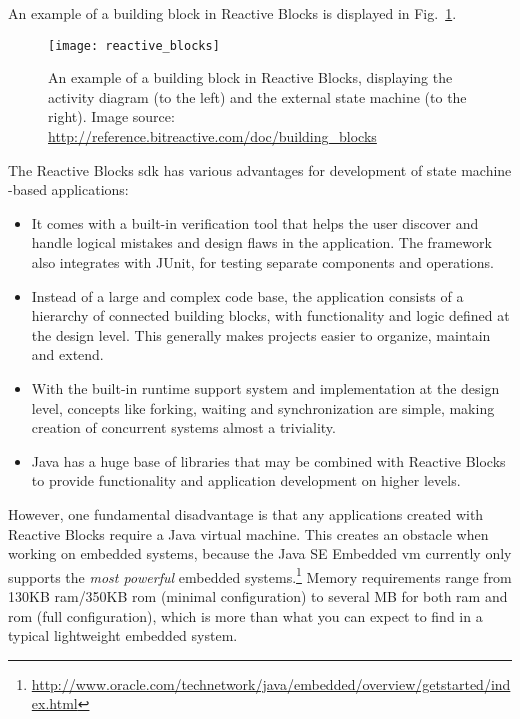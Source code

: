\noindent
An example of a building block in Reactive Blocks is displayed in Fig.~\ref{figure:reactive_blocks}.

\begin{figure}[htp]
	\centering
	\texttt{[image: reactive\_blocks]}
	\caption[A building block in Reactive Blocks]{An example of a building block in Reactive Blocks, displaying the activity diagram (to the left) and the external state machine (to the right). Image source: \url{http://reference.bitreactive.com/doc/building_blocks}}
	\label{figure:reactive_blocks}
\end{figure}

\noindent
The Reactive Blocks \gls{sdk} has various advantages for development of state machine -based applications:

\begin{itemize}
	\item It comes with a built-in verification tool that helps the user discover and handle logical mistakes and design flaws in the application. The framework also integrates with JUnit, for testing separate components and operations.
	\item Instead of a large and complex code base, the application consists of a hierarchy of connected building blocks, with functionality and logic defined at the design level. This generally makes projects easier to organize, maintain and extend.
	\item With the built-in runtime support system and implementation at the design level, concepts like forking, waiting and synchronization are simple, making creation of concurrent systems almost a triviality.
	\item Java has a huge base of libraries that may be combined with Reactive Blocks to provide functionality and application development on higher levels.
\end{itemize}

\noindent
However, one fundamental disadvantage is that any applications created with Reactive Blocks require a Java virtual machine. This creates an obstacle when working on embedded systems, because the Java SE Embedded \gls{vm} currently only supports the \emph{most powerful} embedded systems.\footnote{\url{http://www.oracle.com/technetwork/java/embedded/overview/getstarted/index.html}} Memory requirements range from 130KB \gls{ram}/350KB \gls{rom} (minimal configuration) to several MB for both \gls{ram} and \gls{rom} (full configuration), which is more than what you can expect to find in a typical lightweight embedded system.

